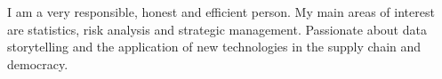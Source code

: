 \begin{flushleft}
I am a very responsible, honest and efficient person.
My main areas of interest are statistics, risk analysis and strategic management.
Passionate about data storytelling and the application of new technologies in the supply chain and democracy.
\end{flushleft}